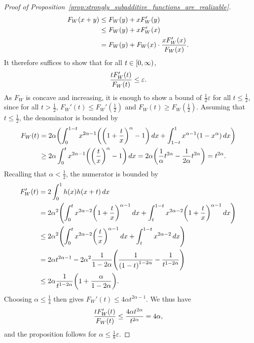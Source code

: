 \documentclass[10pt]{amsart}
\theoremstyle{definition}\newtheorem{defi}[theo]{Definition}\newtheorem{rema}[theo]{Remark}\newtheorem{exam}[theo]{Example}\newtheorem{exem}[theo]{Example}\newtheorem{nota}[theo]{Notation}
\newcommand*\eps{\varepsilon}
\newcommand*\nonnegative{\left[0,\infty\right)}
\let\originalleft\left
\let\originalright\right
\renewcommand{\left}{\mathopen{}\mathclose\bgroup\originalleft}
\renewcommand{\right}{\aftergroup\egroup\originalright}
\let\oldin\in
\renewcommand{\in}{\mathchoice{\oldin}{\oldin}{\,\oldin\,}{\,\oldin\,}}
\begin{document}
\begin{proof}[Proof of Proposition~\ref{prop:strongly_subadditive_functions_are_realizable}]
\begin{align*}
F_{W}\left(x+y\right) & \leq F_{W}\left(y\right)+xF_{W}'\left(y\right)\\
& \leq F_{W}\left(y\right)+xF_{W}'\left(x\right)\\
& =F_{W}\left(y\right)+F_{W}\left(x\right)\cdot\frac{xF_{W}'\left(x\right)}{F_{W}\left(x\right)}.
\end{align*}
It therefore suffices to show that for all $t\in\nonnegative$,
\[
\frac{tF_{W}'\left(t\right)}{F_{W}\left(t\right)}\leq\eps.
\]
As $F_{W}$ is concave and increasing, it is enough to show a bound of $\frac{1}{2}\eps$ for all $t\leq\frac{1}{2}$, since for all $t>\frac{1}{2}$, $F_{W}'(t)\leq F_{W}'(\frac{1}{2})$ and $F_{W}(t)\geq F_{W}(\frac{1}{2})$. Assuming that $t\leq\frac{1}{2}$, the denominator is bounded by
\begin{align*}
F_{W}\left(t\right) & =2\alpha\left(\int_{0}^{1-t}x^{2\alpha-1}\left(\left(1+\frac{t}{x}\right)^{\alpha}-1\right)\,dx+\int_{1-t}^{1}x^{\alpha-1}\left(1-x^{\alpha}\right)\,dx\right)\\
& \geq2\alpha\int_{0}^{t}x^{2\alpha-1}\left(\left(\frac{t}{x}\right)^{\alpha}-1\right)\,dx=2\alpha\left(\frac{1}{\alpha}t^{2\alpha}-\frac{1}{2\alpha}t^{2\alpha}\right)=t^{2\alpha}.
\end{align*}
Recalling that $\alpha<\frac{1}{2}$, the numerator is bounded by
\begin{align*}
F_{W}'\left(t\right) & =2\int_{0}^{1}h\left(x\right)h\left(x+t\right)\,dx\\
& =2\alpha^{2}\left(\int_{0}^{t}x^{2\alpha-2}\left(1+\frac{t}{x}\right)^{\alpha-1}\,dx+\int_{t}^{1-t}x^{2\alpha-2}\left(1+\frac{t}{x}\right)^{\alpha-1}\,dx\right)\\
& \leq2\alpha^{2}\left(\int_{0}^{t}x^{2\alpha-2}\left(\frac{t}{x}\right)^{\alpha-1}\,dx+\int_{t}^{1-t}x^{2\alpha-2}\,dx\right)\\
& =2\alpha t^{2\alpha-1}-2\alpha^{2}\frac{1}{1-2\alpha}\left(\frac{1}{\left(1-t\right)^{1-2\alpha}}-\frac{1}{t^{1-2\alpha}}\right)\\
& \leq2\alpha\frac{1}{t^{1-2\alpha}}\left(1+\frac{\alpha}{1-2\alpha}\right).
\end{align*}
Choosing $\alpha\leq\frac{1}{4}$ then gives $F_{W}'(t)\leq4\alpha t^{2\alpha-1}$. We thus have
\[
\frac{tF_{W}'\left(t\right)}{F_{W}\left(t\right)}\leq\frac{4\alpha t^{2\alpha}}{t^{2\alpha}}=4\alpha,
\]
and the proposition follows for $\alpha\leq\frac{1}{8}\eps$.
\end{proof}
\end{document}
